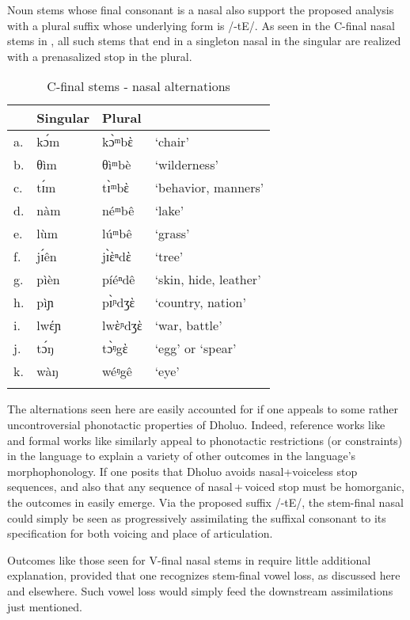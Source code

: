 \documentclass[output=paper,colorlinks,citecolor=brown]{langscibook}
\begin{document}
Noun stems whose final consonant is a nasal also support the proposed analysis with a plural suffix whose underlying form is /-tE/. As seen in the C-final nasal stems in , all such stems that end in a singleton nasal in the singular are realized with a prenasalized stop in the plural. 

\begin{table}
\caption{C-final stems - nasal alternations}
\label{tab:FinalNasalAlt}
 \begin{tabular}{llll}
  \lsptoprule
& Singular & Plural &  \\
\midrule
a.&kɔ́m	&kɔ̀ᵐbὲ&	`chair'\\
b.&	θìm&θìᵐbè	&`wilderness'\\
c.&	tɪ́m&	tɪ̀ᵐbὲ	&`behavior, manners'\\
d.&	nàm	&néᵐbê	&`lake'\\
e.&	lùm &	lúᵐbê	&`grass'\\
f.&	jɪ́ên&	jɪ̀ὲⁿdὲ	&`tree'\\
g.&	pìèn	&píéⁿdê	&`skin, hide, leather'\\
h.&	pìɲ	&pɪ̀ᶮdʒὲ	&`country, nation'\\
i.&	lwέɲ &	lwὲᶮdʒὲ	&`war, battle'\\
j.& 	tɔ́ŋ&	tɔ̀ᵑgὲ	&`egg' or `spear'\\
k.&	wàŋ	&wéᵑgê	&`eye'\\
  \lspbottomrule
 \end{tabular}
\end{table}   

\begin{sloppypar}
The alternations seen here are easily accounted for if one appeals to some rather uncontroversial phonotactic properties of Dholuo. Indeed, reference works like \citet{Tucker1994} and formal works like \citet{Trommer2011} similarly appeal to phonotactic restrictions (or constraints) in the language to explain a variety of other outcomes in the language's morphophonology. If one posits that Dholuo avoids nasal+voiceless stop sequences, and also that any sequence of nasal\,+\,voiced stop must be homorganic, the outcomes in  easily emerge. Via the  proposed suffix /-tE/, the stem-final nasal could simply be seen as progressively assimilating the suffixal consonant to its specification for both voicing and place of articulation.
\end{sloppypar}

Outcomes like those seen for V-final nasal stems in  require little additional explanation, provided that one recognizes stem-final vowel loss, as discussed here and elsewhere. Such vowel loss would simply  feed the downstream assimilations just mentioned.
\end{document}
